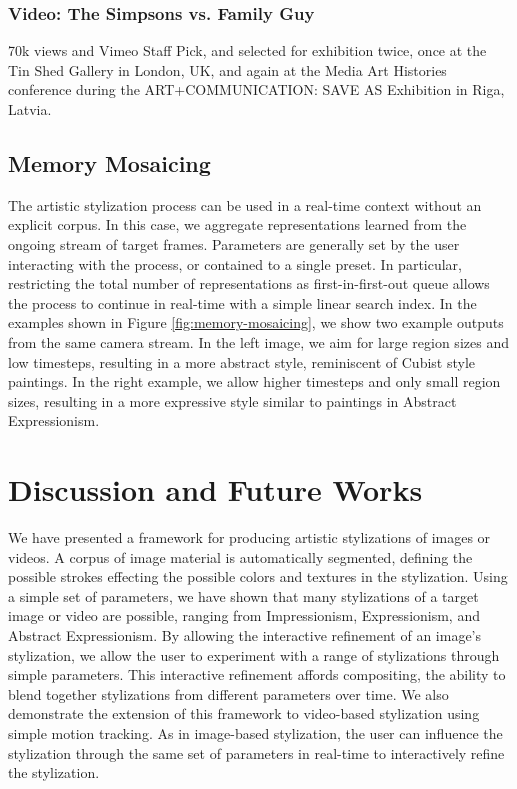 \documentclass[a4paper,10pt,final]{ThesisStyle}
\begin{document}
\subsubsection{Video: The Simpsons vs. Family Guy}

70k views and Vimeo Staff Pick, and selected for exhibition twice, once at the Tin Shed Gallery in London, UK, and again at the Media Art Histories conference during the ART+COMMUNICATION: SAVE AS Exhibition in Riga, Latvia.

\subsection{Memory Mosaicing}\vspace{-0.4em}

The artistic stylization process can be used in a real-time context without an explicit corpus.  In this case, we aggregate representations learned from the ongoing stream of target frames.  Parameters are generally set by the user interacting with the process, or contained to a single preset.  In particular, restricting the total number of representations as first-in-first-out queue allows the process to continue in real-time with a simple linear search index.  In the examples shown in Figure \ref{fig:memory-mosaicing}, we show two example outputs from the same camera stream.  In the left image, we aim for large region sizes and low timesteps, resulting in a more abstract style, reminiscent of Cubist style paintings.  In the right example, we allow higher timesteps and only small region sizes, resulting in a more expressive style similar to paintings in Abstract Expressionism.  

\section{Discussion and Future Works}
We have presented a framework for producing artistic stylizations of images or videos.  A corpus of image material is automatically segmented, defining the possible strokes effecting the possible colors and textures in the stylization.  Using a simple set of parameters, we have shown that many stylizations of a target image or video are possible, ranging from Impressionism, Expressionism, and Abstract Expressionism.  By allowing the interactive refinement of an image's stylization, we allow the user to experiment with a range of stylizations through simple parameters.  This interactive refinement affords compositing, the ability to blend together stylizations from different parameters over time.  We also demonstrate the extension of this framework to video-based stylization using simple motion tracking.  As in image-based stylization, the user can influence the stylization through the same set of parameters in real-time to interactively refine the stylization.  
\end{document}
